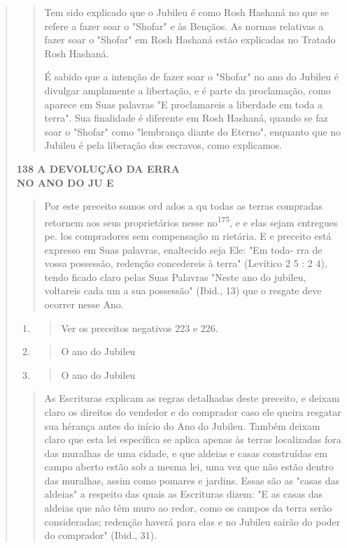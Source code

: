 \begin{quote}
\begin{quote}
Tem sido explicado que o Jubileu é como Rosh Hashaná no que se refere a
fazer soar o "Shofar" e às Bençãos. As normas relativas a fazer soar o
"Shofar" em Rosh Hashaná estão explicadas no Tratado Rosh Hashaná.

É sabido que a intenção de fazer soar o "Shofar" no ano do Jubileu é
divulgar amplamente a libertação, e é parte da proclamação, como aparece
em Suas palavras "E proclamareis a liberdade em toda a terra". Sua
finalidade é diferente em Rosh Hashaná, quando se faz soar o "Shofar"
como "lembrança diante do Eterno", enquanto que no Jubileu é pela
liberação dos escravos, co­mo explicamos.
\end{quote}

\textbf{138 A DEVOLUÇÃO DA ERRA\\
NO ANO DO JU E}

\begin{quote}
Por este preceito somos ord ados a qu todas as terras compradas retornem
aos seus proprietários nesse no\textsuperscript{175}, e e elas sejam
entregues pe­. los compradores sem compensação m rietária. E e preceito
está expresso em Suas palavras, enaltecido seja Ele: "Em toda- rra de
vossa possessão, reden­ção concedereis à terra" (Levítico 2 5 : 2 4),
tendo ficado claro pelas Suas Pala­vras "Neste ano do jubileu, voltareis
cada um a sua possessão" (Ibid., 13) que o resgate deve ocorrer nesse
Ano.
\end{quote}

\begin{enumerate}
\def\labelenumi{\arabic{enumi}.}
\setcounter{enumi}{172}
\item
 \begin{quote}
 Ver os preceitos negativos 223 e 226.
 \end{quote}
\item
 \begin{quote}
 O ano do Jubileu
 \end{quote}
\item
 \begin{quote}
 O ano do Jubileu
 \end{quote}
\end{enumerate}

\begin{quote}As Escrituras explicam as regras detalhadas deste preceito, e deixam
claro os direitos do vendedor e do comprador caso ele queira resgatar
sua hé­rança antes do início do Ano do Jubileu. Também deixam claro que
esta lei es­pecífica se aplica apenas às terras localizadas fora das
muralhas de uma cidade, e que aldeias e casas construídas em campo
aberto estão sob a mesma lei, uma vez que não estão dentro das muralhas,
assim como pomares e jardins. Essas são as "casas das aldeias" a
respeito das quais as Escrituras dizem: "E as casas das aldeias que não
têm muro ao redor, como os campos da terra serão consi­deradas; redenção
haverá para elas e no Jubileu sairão do poder do compra­dor" (Ibid.,
31).


\end{quote}
\end{quote}
